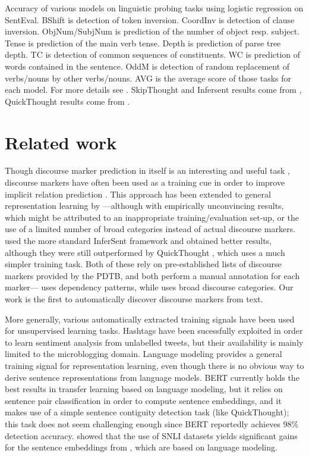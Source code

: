 \documentclass[11pt,a4paper]{article}
\begin{document}
\begin{table*}[htb]
\caption{
Accuracy of various models on linguistic probing tasks using logistic regression on SentEval.
BShift is detection of token inversion.  CoordInv is detection of clause inversion. ObjNum/SubjNum is prediction of the number of object resp. subject. Tense is prediction of the main verb tense. Depth is prediction of parse tree depth. TC is detection of common sequences of constituents. WC is prediction of words contained in the sentence. OddM is detection of random replacement of verbs/nouns by other verbs/nouns. AVG is the average score of those tasks for each model.
For more details see \citet{ConneauProbe}. SkipThought and Infersent results come from \citet{Perone2018EvaluationOS}, QuickThought results come from \citet{Brahma2018UnsupervisedLO}.}
\label{tab:probe}
\end{table*}
\section{Related work}
Though discourse marker prediction in itself is an interesting and useful task \citep{Malmi2017}, discourse markers have often been used as a training cue in order to improve implicit relation prediction \citep{Marcu2001,Sporleder2005ExploitingLC,Zhou2010,braud-denis:2016:EMNLP2016}.
This approach has been extended to general representation learning by \citet{Jernite2017}---although with empirically unconvincing results, which might be attributed to an inappropriate training/evaluation set-up, or the use of a limited number of broad categories instead of actual discourse markers. \citet{Nie2017} used the more standard InferSent framework and obtained better results, although they were still outperformed by QuickThought \citep{Logeswaran2018}, which uses a much simpler training task. Both of these rely on pre-established lists of discourse markers provided by the PDTB, and both perform a manual annotation for each marker---\citet{Nie2017} uses dependency patterns, while \citet{Jernite2017} uses broad discourse categories. Our work is the first to automatically discover discourse markers from text.

More generally, various automatically extracted training signals have been used for unsupervised learning tasks. Hashtags \citep{Felbo2017UsingMO} have been sucessfully exploited in order to learn sentiment analysis from unlabelled tweets, but their availability is mainly limited to the microblogging domain.
Language modeling provides a general training signal for representation learning, even though there is no obvious way to derive sentence representations from language models. BERT \citep{devlin2018bert} currently holds the best results in transfer learning based on language modeling, but it relies on sentence pair classification in order to compute sentence embeddings, and it makes use of a simple sentence contiguity detection task (like QuickThought); this task does not seem challenging enough since BERT reportedly achieves 98\% detection accuracy. \citet{PhangSTILTS} showed that the use of SNLI datasets yields significant gains for the sentence embeddings from \citet{Radford2018ImprovingLU}, which are based on language modeling.
\end{document}
